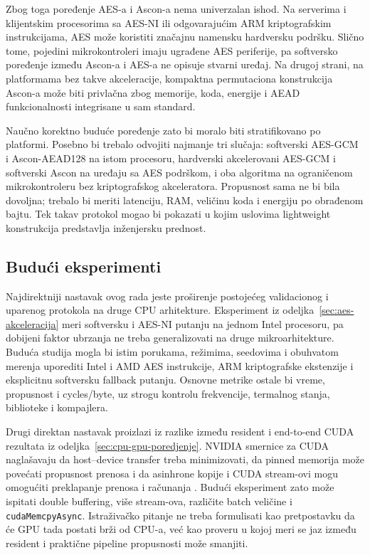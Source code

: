 Zbog toga poređenje AES-a i Ascon-a nema univerzalan ishod. Na
serverima i klijentskim procesorima sa AES-NI ili odgovarajućim ARM
kriptografskim instrukcijama, AES može koristiti značajnu namensku
hardversku podršku. Slično tome, pojedini mikrokontroleri imaju ugrađene
AES periferije, pa softversko poređenje između Ascon-a i AES-a ne opisuje
stvarni uređaj. Na drugoj strani, na platformama bez takve akceleracije,
kompaktna permutaciona konstrukcija Ascon-a može biti privlačna zbog
memorije, koda, energije i AEAD funkcionalnosti integrisane u sam
standard.

Naučno korektno buduće poređenje zato bi moralo biti stratifikovano po
platformi. Posebno bi trebalo odvojiti najmanje tri slučaja: softverski
AES-GCM i Ascon-AEAD128 na istom procesoru, hardverski akcelerovani
AES-GCM i softverski Ascon na uređaju sa AES podrškom, i oba algoritma
na ograničenom mikrokontroleru bez kriptografskog akceleratora.
Propusnost sama ne bi bila dovoljna; trebalo bi meriti latenciju, RAM,
veličinu koda i energiju po obrađenom bajtu. Tek takav protokol mogao bi
pokazati u kojim uslovima lightweight konstrukcija predstavlja
inženjersku prednost.


\subsection{Budući eksperimenti}

Najdirektniji nastavak ovog rada jeste proširenje postojećeg
validacionog i uparenog protokola na druge CPU arhitekture. Eksperiment iz
odeljka~\ref{sec:aes-akceleracija} meri softversku i AES-NI putanju na
jednom Intel procesoru, pa dobijeni faktor ubrzanja ne treba
generalizovati na druge mikroarhitekture. Buduća studija mogla bi istim
porukama, režimima, seedovima i obuhvatom merenja uporediti Intel i AMD
AES instrukcije, ARM kriptografske ekstenzije i eksplicitnu softversku
fallback putanju. Osnovne metrike ostale bi vreme, propusnost i
cycles/byte, uz strogu kontrolu frekvencije, termalnog stanja, biblioteke
i kompajlera.

Drugi direktan nastavak proizlazi iz razlike između resident i end-to-end
CUDA rezultata iz odeljka~\ref{sec:cpu-gpu-poredjenje}. NVIDIA smernice
za CUDA naglašavaju da host--device transfer treba minimizovati, da pinned
memorija može povećati propusnost prenosa i da asinhrone kopije i CUDA
stream-ovi mogu omogućiti preklapanje prenosa i računanja
\cite{NVIDIACUDABestPractices}. Budući eksperiment zato može ispitati
double buffering, više stream-ova, različite batch veličine i
\texttt{cudaMemcpyAsync}. Istraživačko pitanje ne treba formulisati kao
pretpostavku da će GPU tada postati brži od CPU-a, već kao proveru u kojoj
meri se jaz između resident i praktične pipeline propusnosti može smanjiti.

